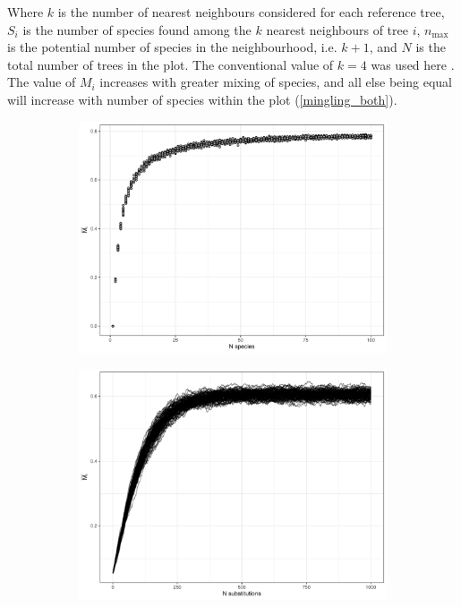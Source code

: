 \documentclass[11pt,a4paper]{article}
\begin{document}
Where $k$ is the number of nearest neighbours considered for each reference tree, $S_{i}$ is the number of species found among the $k$ nearest neighbours of tree $i$, $n_{\text{max}}$ is the potential number of species in the neighbourhood, i.e. $k + 1$, and $N$ is the total number of trees in the plot. The conventional value of $k = 4$ was used here \citep{Gadow2002, Hui2004, Hui2007}. The value of $M_{i}$ increases with greater mixing of species, and all else being equal will increase with number of species within the plot (\autoref{mingling_both}).

\begin{figure}
	\begin{subfigure}{0.45\linewidth}
		\includegraphics[width=\linewidth]{mingling_nspecies}
		\caption{}
		\label{mingling_nspecies}
	\end{subfigure}
	\hfill
	\begin{subfigure}{0.45\linewidth}
		\includegraphics[width=\linewidth]{mingling_nmingl}

\end{subfigure}
\end{figure}
\end{document}
